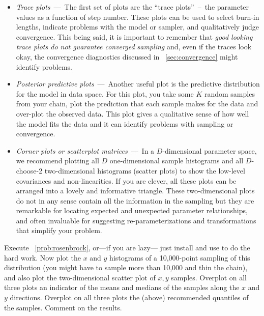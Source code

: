 \documentclass[modern]{aastex61}
\begin{document}
\begin{itemize}
\item \emph{Trace plots}~---~The first set of plots are the ``trace
plots''~--~the parameter values as a function of step number.
These plots can be used to select burn-in lengths, indicate problems with the
model or sampler, and qualitatively judge convergence.
This being said, it is important to remember that \emph{good looking trace
plots do not guarantee converged sampling} and, even if the traces look okay,
the convergence diagnostics discussed in \sectionname~\ref{sec:convergence}
might identify problems.

\item \emph{Posterior predictive plots}~---~Another useful plot is the
predictive distribution for the model in data space.
For this plot, you take some $K$ random samples from your chain, plot the
prediction that each sample makes for the data and over-plot the observed
data.
This plot gives a qualitative sense of how well the model fits the data and it
can identify problems with sampling or convergence.

\item \emph{Corner plots or scatterplot matrices}~---~In a $D$-dimensional
parameter space, we recommend plotting all $D$ one-dimensional sample
histograms and all $D$-choose-2 two-dimensional histograms (scatter plots) to
show the low-level covariances and non-linearities.
If you are clever, all these plots can be arranged into a lovely and
informative triangle. These two-dimensional plots
do not in any sense contain all the information in the sampling but they are
remarkable for locating expected and unexpected parameter relationships, and
often invaluable for suggesting re-parameterizations and transformations that
simplify your problem.
\end{itemize}

\begin{problem}\label{prob:rosenbrock2}
Execute \problemname~\ref{prob:rosenbrock}, or---if you are lazy---%
just install and use  to do the hard work.
Now plot the $x$ and $y$ histograms of a 10,000-point sampling of this
distribution (you might have to sample more than 10,000 and thin the
chain), and also plot the two-dimensional scatter plot of $x,y$
samples.
Overplot on all three plots an indicator of the means and medians of
the samples along the $x$ and $y$ directions.
Overplot on all three plots the (above) recommended quantiles of the
samples.
Comment on the results.
\end{problem}
\end{document}
